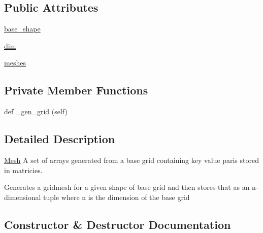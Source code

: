 \subsection*{Public Attributes}
\begin{DoxyCompactItemize}
\item 
\hyperlink{classMain__PDE__Repo_1_1src_1_1mesh_1_1Mesh_a1da23a0977d75b18603c49d2c7bf59ba}{base\+\_\+shape}
\item 
\hyperlink{classMain__PDE__Repo_1_1src_1_1mesh_1_1Mesh_a3b4d75bfb8cf60c362ab018eb26202ba}{dim}
\item 
\hyperlink{classMain__PDE__Repo_1_1src_1_1mesh_1_1Mesh_aa2e44de653f55fa440bde47a47fc67f0}{meshes}
\end{DoxyCompactItemize}
\subsection*{Private Member Functions}
\begin{DoxyCompactItemize}
\item 
def \hyperlink{classMain__PDE__Repo_1_1src_1_1mesh_1_1Mesh_a9229b4fc718a95c8f6b0fe47d6a16867}{\+\_\+gen\+\_\+grid} (self)
\end{DoxyCompactItemize}


\subsection{Detailed Description}
\hyperlink{classMain__PDE__Repo_1_1src_1_1mesh_1_1Mesh}{Mesh} A set of arrays generated from a base grid containing key value paris stored in matricies. 

Generates a gridmesh for a given shape of base grid and then stores that as an n-\/dimensional tuple where n is the dimension of the base grid 

\subsection{Constructor \& Destructor Documentation}
\mbox{\label{classMain__PDE__Repo_1_1src_1_1mesh_1_1Mesh_a6b6acfdda769157a8d3b762b8e60106e}} 
